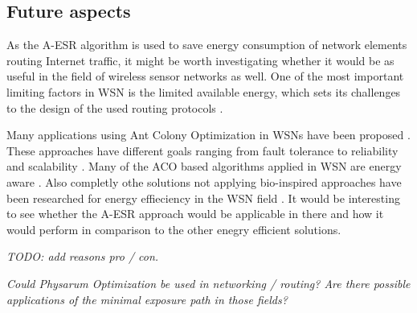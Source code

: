 \documentclass{IWORK2014}
\begin{document}
\subsection{Future aspects}
As the A-ESR algorithm is used to save energy consumption of network elements routing Internet traffic, it might be worth investigating whether it would be as useful in the field of wireless sensor networks as well. One of the most important limiting factors in WSN is the limited available energy, which sets its challenges to the design of the used routing protocols \cite{hylsberg2011bioinspired}.

Many applications using Ant Colony Optimization in WSNs have been proposed \cite{bennis2013enhanced, zhang2004improvements, camilo2006energy, cai2006aco, sun2008asar, kiri2007self, ghasemaghaei2007ant}. These approaches have different goals ranging from fault tolerance \cite{zhang2004improvements} to reliability and scalability \cite{kiri2007self}. Many of the ACO based algorithms applied in WSN are energy aware \cite{saleem2011swarm}. Also completly othe solutions not applying bio-inspired approaches have been researched for energy effieciency in the WSN field \cite{wightman2008a3}. It would be interesting to see whether the A-ESR approach would be applicable in there and how it would perform in comparison to the other enegry efficient solutions.

\textit{TODO: add reasons pro / con.}

\textit{Could Physarum Optimization be used in networking / routing? Are there possible applications of the minimal exposure path in those fields?}



\end{document}
